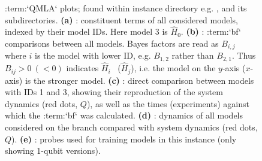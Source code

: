 \begin{figure}[H]
    \begin{center}
        \qquad
        \qquad
        \qquad
        \qquad
    \end{center}
    \caption[instance plots]{
        :term:`QMLA` plots; found within instance directory e.g. , 
        and its subdirectories. 
        \textbf{(a)} : constituent terms of all considered models, indexed by their model IDs.
        Here model 3 is $\hat{H}_{0}$. 
        \textbf{(b)} : :term:`bf` comparisons between all models. 
        Bayes factors are read as $B_{i,j}$ where $i$ is the model with lower ID, 
            e.g. $B_{1,2}$ rather than $B_{2,1}$. 
            Thus $B_{ij} > 0 \ (<0)$ indicates $\hat{H}_i$ \ ($\hat{H}_j$), i.e. the model on the $y$-axis ($x$-axis) 
            is the stronger model.
        \textbf{(c)} : direct comparison between models with IDs 1 and 3, 
            showing their reproduction of the system dynamics (red dots, $Q$), 
            as well as the times (experiments) against which the :term:`bf` was calculated. 
        \textbf{(d)} : dynamics of all models considered on the branch
        compared with system dynamics (red dots, $Q$). 
        \textbf{(e)} : probes used for training models in this instance (only showing 1-qubit versions).
    }
    \label{fig:instance_plots}
\end{figure}

